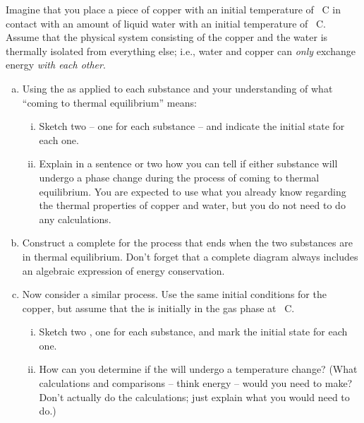 \label{FNT1.1.3-6}

Imagine that you place a piece of copper with an initial temperature of \unit[20]{\textdegree C} in contact with an amount of liquid water with an initial temperature of \unit[100]{\textdegree C}. Assume that the physical system consisting of the copper and the water is thermally isolated from everything else; i.e., water and copper can \emph{only} exchange energy \emph{with each other}.

\begin{enumerate}[(a)]
	\item Using the \ThreePhaseModel{} as applied to each substance and your understanding of what ``coming to thermal equilibrium'' means:
	
	\begin{enumerate}[i.]
		\item Sketch two \TempGraphs{} -- one for each substance -- and indicate the initial state for each one.
		\item Explain in a sentence or two how you can tell if either substance will undergo a phase change during the process of coming to thermal equilibrium. You are expected to use what you already know regarding the thermal properties of copper and water, but you do not need to do any calculations.
	\end{enumerate}
	
	\item Construct a complete \EnergyDiagram{} for the process that ends when the two substances are in thermal equilibrium. Don't forget that a complete diagram always includes an algebraic expression of energy conservation.
	
	\item Now consider a similar process. Use the same initial conditions for the copper, but assume that the  is initially in the gas phase at \unit[100]{\textdegree C}.
	\begin{enumerate}[i.]
		\item Sketch two \TempGraphs{}, one for each substance, and mark the initial state for each one.
		\item How can you determine if the  will undergo a temperature change? (What calculations and comparisons -- think energy -- would you need to make?  Don't actually do the calculations; just explain what you would need to do.)
	\end{enumerate}
\end{enumerate}